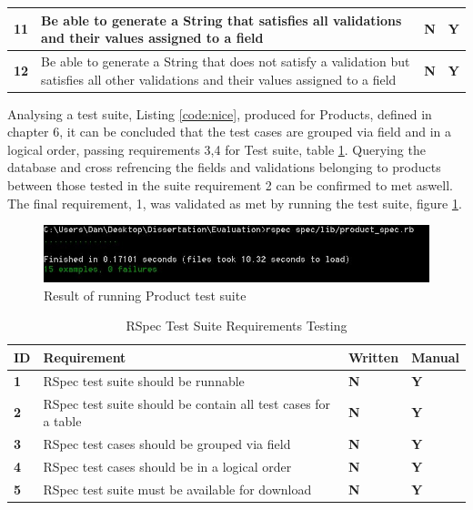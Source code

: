 \documentclass[a4paper,12pt]{article}
\begin{document}
\begin{table}
\begin{tabularx}{\textwidth}{|l|X|l|l|}
\textbf{11} & Be able to generate a String that satisfies all validations and their values assigned to a field                                            & \textbf{N}   & \textbf{Y}       \\ \hline
\textbf{12} & Be able to generate a String that does not satisfy a validation but satisfies all other validations and their values assigned to a field    & \textbf{N}   & \textbf{Y}      \\ \hline
\end{tabularx}
\end{table}

\par Analysing a test suite, Listing \ref{code:nice}, produced for Products, defined in chapter 6, it can be concluded that the test cases are grouped via field and in a logical order, passing requirements 3,4 for Test suite, table \ref{met:3}. Querying the database and cross refrencing the fields and validations belonging to products between those tested in the suite requirement 2 can be confirmed to met aswell. The final requirement, 1, was validated as met by running the test suite, figure \ref{fig:runsuite}.

\begin{figure}
\includegraphics[width=\linewidth]{screenshots/runsuite}
\caption{Result of running Product test suite}
\label{fig:runsuite}
\end{figure}

\begin{table}
\centering
\caption{RSpec Test Suite Requirements Testing}
\label{met:3}
\begin{tabularx}{\textwidth}{|l|X|l|l|}
\hline
\textbf{ID} & \textbf{Requirement}                                          & \textbf{Written} & \textbf{Manual} \\ \hline
\textbf{1}  & RSpec test suite should be runnable                          & \textbf{N}   & \textbf{Y}       \\ \hline
\textbf{2}  & RSpec test suite should be contain all test cases for a table  & \textbf{N}   & \textbf{Y}      \\ \hline
\textbf{3}  & RSpec test cases should be grouped via field                 & \textbf{N}   & \textbf{Y}      \\ \hline
\textbf{4}  & RSpec test cases should be in a logical order                 & \textbf{N}   & \textbf{Y}      \\ \hline
\textbf{5}  & RSpec test suite must be available for download               & \textbf{N}   & \textbf{Y}     \\ \hline
\end{tabularx}
\end{table}
\end{document}
